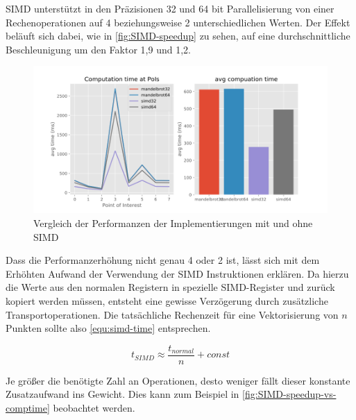 


SIMD unterstützt in den Präzisionen 32 und 64 bit Parallelisierung von einer Rechenoperationen auf
4 beziehungsweise 2 unterschiedlichen Werten. Der Effekt beläuft sich dabei, wie in \autoref{fig:SIMD-speedup} zu sehen,
auf eine durchschnittliche Beschleunigung um den Faktor 1,9 und 1,2.

\begin{figure}
	\centering
	\includegraphics[width=0.9\linewidth]{img/Evaluation/impl_test}
	\caption{Vergleich der Performanzen der Implementierungen mit und ohne SIMD}
	\label{fig:SIMD-speedup}
\end{figure}

Dass die Performanzerhöhung nicht genau 4 oder 2 ist, lässt sich mit dem Erhöhten Aufwand der Verwendung
der SIMD Instruktionen erklären.
Da hierzu die Werte aus den normalen Registern in spezielle SIMD-Register und zurück
kopiert werden müssen, entsteht eine gewisse Verzögerung durch zusätzliche Transportoperationen.
Die tatsächliche Rechenzeit für eine Vektorisierung von \(n\) Punkten sollte also \autoref{equ:simd-time} entsprechen.

\begin{equation}\label{equ:simd-time}
	t_{SIMD} \approx \frac{t_{normal}}{n}+ const
\end{equation}

Je größer die benötigte Zahl an Operationen, desto weniger fällt dieser konstante Zusatzaufwand ins Gewicht.
Dies kann zum Beispiel in \autoref{fig:SIMD-speedup-vs-comptime} beobachtet werden.

